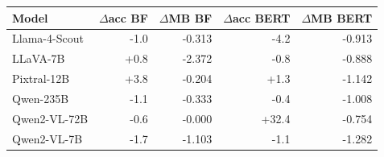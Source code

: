 \begin{tabular}{lrrrr}
\toprule
Model & $\Delta$acc BF & $\Delta$MB BF & $\Delta$acc BERT & $\Delta$MB BERT \\
\midrule
Llama-4-Scout & -1.0 & -0.313 & -4.2 & -0.913 \\
LLaVA-7B & +0.8 & -2.372 & -0.8 & -0.888 \\
Pixtral-12B & +3.8 & -0.204 & +1.3 & -1.142 \\
Qwen-235B & -1.1 & -0.333 & -0.4 & -1.008 \\
Qwen2-VL-72B & -0.6 & -0.000 & +32.4 & -0.754 \\
Qwen2-VL-7B & -1.7 & -1.103 & -1.1 & -1.282 \\
\bottomrule
\end{tabular}
